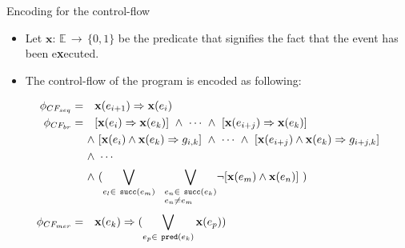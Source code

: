 \documentclass{beamer}
\newcommand*{\fx}{\ensuremath{\mathbf{x}}}%
\newcommand{\defeq}{\ensuremath{=}}%
\begin{document}
\begin{frame}{Encoding for the control-flow} %

\begin{itemize}
\item Let $\fx:\,\mathbb{E}\,\rightarrow\,\{0,1\}$ be the predicate that signifies the fact that the event has been e\textbf{x}ecuted.
\item The control-flow of the program is encoded as following:
\end{itemize}

\vspace{-20pt}
\begin{align}
\phi_{CF_{seq}} \defeq \quad & \fx(e_{i+1}) \Rightarrow \fx(e_i) \nonumber\\
\phi_{CF_{br}}  \defeq \quad & [\fx(e_i) \Rightarrow \fx(e_k)] \ \land \ \cdots \ \land \ [\fx(e_{i+j}) \Rightarrow \fx(e_k)] \nonumber \nonumber\\
                       \land & \ [\fx(e_i) \land \fx(e_k) \Rightarrow g_{i,k}] \ \land \ \cdots \ \land \ [\fx(e_{i+j}) \land \fx(e_k) \Rightarrow g_{i+j,k}] \nonumber \\
                       \land & \ \cdots \nonumber \nonumber\\
                       \land & \ ( \bigvee_{e_l \in \ \texttt{succ}(e_m)} \ \ \bigvee_{\begin{subarray}{l}e_n \in \ \texttt{succ}(e_k) \nonumber\\
                               e_n \neq e_m\end{subarray}} \! \lnot [\fx(e_m) \land \fx(e_n)] \ ) \nonumber\\
\phi_{CF_{mer}} \defeq \quad & \fx(e_k) \Rightarrow (\bigvee\limits_{e_p \in \ \texttt{pred}(e_k)}^{} \fx(e_p)) \nonumber
\end{align}

\end{frame}
\end{document}
